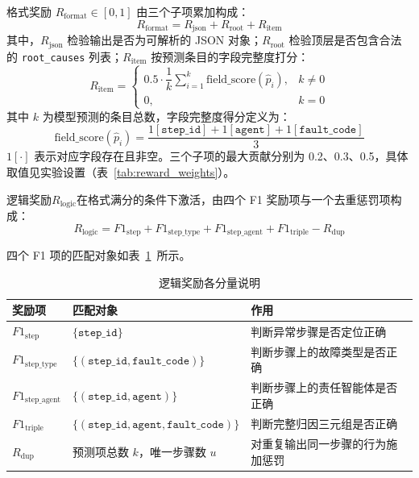 格式奖励 $R_{\text{format}} \in [0,1]$ 由三个子项累加构成：
\begin{equation}
  R_{\text{format}} = R_{\text{json}} + R_{\text{root}} + R_{\text{item}}
\end{equation}
 其中，$R_{\text{json}}$ 检验输出是否为可解析的 JSON 对象；$R_{\text{root}}$ 检验顶层是否包含合法的 \texttt{root\_causes} 列表；$R_{\text{item}}$ 按预测条目的字段完整度打分：
\begin{equation}
  R_{\text{item}} = \begin{cases}
    0.5 \cdot \dfrac{1}{k}\displaystyle\sum_{i=1}^{k} \text{field\_score}(\hat{p}_i), & k \neq 0 \\[6pt]
    0, & k = 0
  \end{cases}
\end{equation}
其中 $k$ 为模型预测的条目总数，字段完整度得分定义为：
\begin{equation}
  \text{field\_score}(\hat{p}_i) = \frac{ 1[\texttt{step\_id}] + 1[\texttt{agent}] + 1[\texttt{fault\_code}]}{3}
\end{equation}
$1[\cdot]$ 表示对应字段存在且非空。三个子项的最大贡献分别为 0.2、0.3、0.5，具体取值见实验设置（表~\ref{tab:reward_weights}）。
 
逻辑奖励$R_{\text{logic}}$在格式满分的条件下激活，由四个 F1 奖励项与一个去重惩罚项构成：
\begin{equation}
  R_{\text{logic}} = F1_{\text{step}} + F1_{\text{step\_type}} + F1_{\text{step\_agent}} + F1_{\text{triple}} - R_{\text{dup}}
\end{equation}

四个 F1 项的匹配对象如表~\ref{tab:reward}~所示。

\begin{table}[htbp]
  \centering
  \caption{逻辑奖励各分量说明}
  \label{tab:reward}
  \renewcommand{\arraystretch}{1.35}
  \small
  \begin{tabular}{p{2.4cm} p{5.6cm} p{6.6cm}}
    \hline
    \textbf{奖励项} & \textbf{匹配对象} & \textbf{作用} \\
    \hline
    $F1_{\text{step}}$       & $\{\texttt{step\_id}\}$ & 判断异常步骤是否定位正确 \\
    $F1_{\text{step\_type}}$ & $\{(\texttt{step\_id}, \texttt{fault\_code})\}$  & 判断步骤上的故障类型是否正确 \\
    $F1_{\text{step\_agent}}$& $\{(\texttt{step\_id}, \texttt{agent})\}$ & 判断步骤上的责任智能体是否正确 \\
    $F1_{\text{triple}}$     & $\{(\texttt{step\_id}, \texttt{agent}, \texttt{fault\_code})\}$ & 判断完整归因三元组是否正确 \\
    $R_{\text{dup}}$         & 预测项总数 $k$，唯一步骤数 $u$ & 对重复输出同一步骤的行为施加惩罚 \\
    \hline
  \end{tabular}
\end{table}

